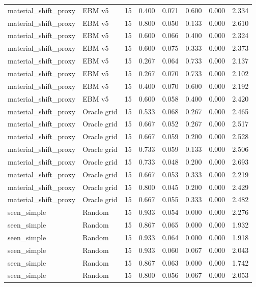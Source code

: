{\begin{longtable}{llrrrrrr}
material\_shift\_proxy & EBM v5 & 15 & 0.400 & 0.071 & 0.600 & 0.000 & 2.334 \\
material\_shift\_proxy & EBM v5 & 15 & 0.800 & 0.050 & 0.133 & 0.000 & 2.610 \\
material\_shift\_proxy & EBM v5 & 15 & 0.600 & 0.066 & 0.400 & 0.000 & 2.324 \\
material\_shift\_proxy & EBM v5 & 15 & 0.600 & 0.075 & 0.333 & 0.000 & 2.373 \\
material\_shift\_proxy & EBM v5 & 15 & 0.267 & 0.064 & 0.733 & 0.000 & 2.137 \\
material\_shift\_proxy & EBM v5 & 15 & 0.267 & 0.070 & 0.733 & 0.000 & 2.102 \\
material\_shift\_proxy & EBM v5 & 15 & 0.400 & 0.070 & 0.600 & 0.000 & 2.192 \\
material\_shift\_proxy & EBM v5 & 15 & 0.600 & 0.058 & 0.400 & 0.000 & 2.420 \\
material\_shift\_proxy & Oracle grid & 15 & 0.533 & 0.068 & 0.267 & 0.000 & 2.465 \\
material\_shift\_proxy & Oracle grid & 15 & 0.667 & 0.052 & 0.267 & 0.000 & 2.517 \\
material\_shift\_proxy & Oracle grid & 15 & 0.667 & 0.059 & 0.200 & 0.000 & 2.528 \\
material\_shift\_proxy & Oracle grid & 15 & 0.733 & 0.059 & 0.133 & 0.000 & 2.506 \\
material\_shift\_proxy & Oracle grid & 15 & 0.733 & 0.048 & 0.200 & 0.000 & 2.693 \\
material\_shift\_proxy & Oracle grid & 15 & 0.667 & 0.053 & 0.333 & 0.000 & 2.219 \\
material\_shift\_proxy & Oracle grid & 15 & 0.800 & 0.045 & 0.200 & 0.000 & 2.429 \\
material\_shift\_proxy & Oracle grid & 15 & 0.667 & 0.055 & 0.333 & 0.000 & 2.482 \\
seen\_simple & Random & 15 & 0.933 & 0.054 & 0.000 & 0.000 & 2.276 \\
seen\_simple & Random & 15 & 0.867 & 0.065 & 0.000 & 0.000 & 1.932 \\
seen\_simple & Random & 15 & 0.933 & 0.064 & 0.000 & 0.000 & 1.918 \\
seen\_simple & Random & 15 & 0.933 & 0.060 & 0.067 & 0.000 & 2.043 \\
seen\_simple & Random & 15 & 0.867 & 0.063 & 0.000 & 0.000 & 1.742 \\
seen\_simple & Random & 15 & 0.800 & 0.056 & 0.067 & 0.000 & 2.053 \\

\end{longtable}}
